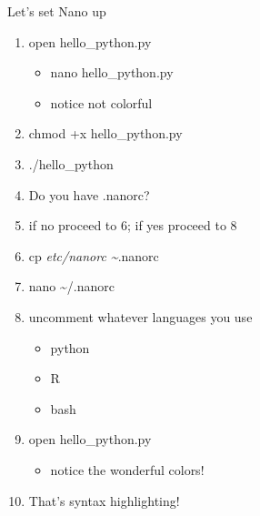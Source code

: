 \documentclass[t,10pt]{beamer}
\begin{document}
\begin{frame}[label={sec:orgheadline16}]{Let's set Nano up}
\begin{enumerate}[<+->]
\item open hello\_python.py
\begin{itemize}
\item nano hello\_python.py
\item notice not colorful
\end{itemize}
\item chmod +x hello\_python.py
\item ./hello\_python
\item Do you have .nanorc?
\item if no proceed to 6; if yes proceed to 8
\item cp \emph{etc/nanorc \textasciitilde{}}.nanorc
\item nano \textasciitilde{}/.nanorc
\item uncomment whatever languages you use
\begin{itemize}
\item python
\item R
\item bash
\end{itemize}
\item open hello\_python.py
\begin{itemize}
\item notice the wonderful colors!
\end{itemize}
\item That's syntax highlighting!
\end{enumerate}
\end{frame}
\end{document}

